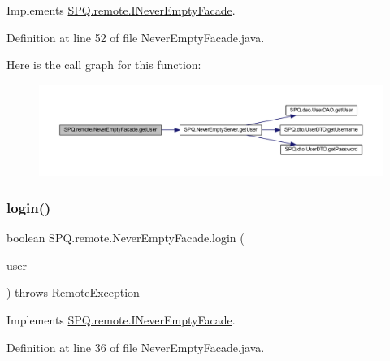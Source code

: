 Implements \mbox{\hyperlink{interface_s_p_q_1_1remote_1_1_i_never_empty_facade_aa329dfc23ab0832e73802bf2df90b9e0}{S\+P\+Q.\+remote.\+I\+Never\+Empty\+Facade}}.



Definition at line 52 of file Never\+Empty\+Facade.\+java.

Here is the call graph for this function\+:\nopagebreak
\begin{figure}[H]
\begin{center}
\leavevmode
\includegraphics[width=350pt]{class_s_p_q_1_1remote_1_1_never_empty_facade_a32679a25e12c8a33e84087de357cd616_cgraph}
\end{center}
\end{figure}
\mbox{\label{class_s_p_q_1_1remote_1_1_never_empty_facade_a3fdd96efa1256ea520a497b8a20578e8}} 
\subsubsection{\texorpdfstring{login()}{login()}}
{\footnotesize\ttfamily boolean S\+P\+Q.\+remote.\+Never\+Empty\+Facade.\+login (\begin{DoxyParamCaption}\item[{\mbox{\hyperlink{class_s_p_q_1_1dto_1_1_user_d_t_o}{User\+D\+TO}}}]{user }\end{DoxyParamCaption}) throws Remote\+Exception}



Implements \mbox{\hyperlink{interface_s_p_q_1_1remote_1_1_i_never_empty_facade_a2440fa36695c63e4e4c30fc25965f853}{S\+P\+Q.\+remote.\+I\+Never\+Empty\+Facade}}.



Definition at line 36 of file Never\+Empty\+Facade.\+java.

